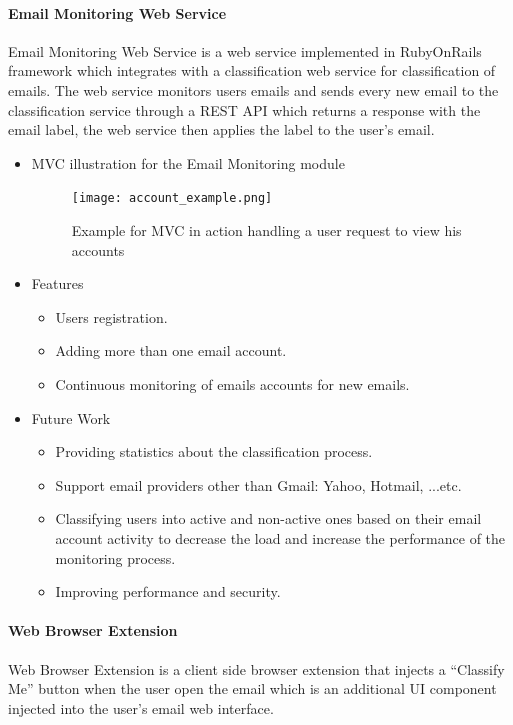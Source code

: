 \paragraph{Email Monitoring Web Service} 

Email Monitoring Web Service is a web service implemented in RubyOnRails \cite{ROR} framework which integrates 
with a classification web service for classification of emails. The web service monitors 
users emails and sends every new email to the classification service through a REST API \cite{REST}
which returns a response with the email label, the web service then applies the label to the user’s email.

\begin{itemize}
 \item MVC illustration for the Email Monitoring module
 \begin{figure}[H]
   \centering
   \texttt{[image: account\_example.png]}
   \caption[Example for MVC in action handling a user request to view his 
   accounts]{Example for MVC in action handling a user request to view his accounts}
 \end{figure}

 \item Features
 \begin{itemize}
    \item Users registration.
    \item Adding more than one email account.
    \item Continuous monitoring of emails accounts for new emails.
 \end{itemize}
 
 \item Future Work
  \begin{itemize}
    \item Providing statistics about the classification process.
    \item Support email providers other than Gmail: Yahoo, Hotmail, ...etc.
    \item Classifying users into active and non-active ones based on their 
    email account activity to decrease the load and increase the performance 
    of the monitoring process.
    \item Improving performance and security.
  \end{itemize}
\end{itemize}

\paragraph{Web Browser Extension}
Web Browser Extension is a client side browser extension that injects a 
``Classify Me'' button when the user open the email which is an additional 
UI component injected into the user's email web interface. 


